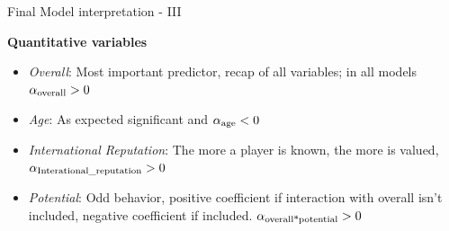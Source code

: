 \documentclass[aspectratio=169,xcolor=dvipsnames]{beamer}
\begin{document}
\begin{frame}{Final Model interpretation - III}

\begin{large}
\begin{center}
\textbf{Quantitative variables}
\end{center}
\end{large}

\vspace{5mm}


\begin{itemize}
    
    \item \textit{Overall}: Most important predictor, recap of all variables; in all models $ \alpha\textsubscript{overall} > 0$ 
    
    \item \textit{Age}: As expected significant and $\alpha\textsubscript{age} < 0$
    
    \item \textit{International Reputation}: The more a player is known, the more is valued, $ \alpha\textsubscript{Interational\_reputation} > 0 $
    
    \item \textit{Potential}: Odd behavior, positive coefficient if interaction with overall isn't included, negative coefficient if included. $\alpha\textsubscript{overall*potential} > 0$
\end{itemize}
\end{frame}

\end{document}
